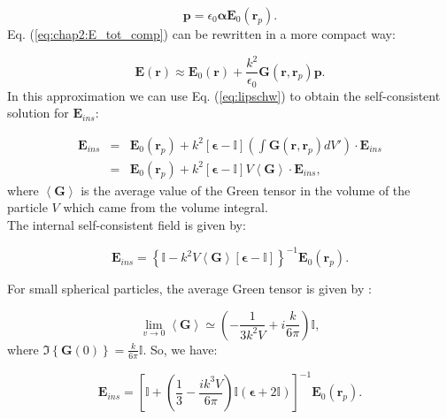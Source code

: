 \begin{equation}
\mathbf{p}=\epsilon_0\boldsymbol{\alpha}\mathbf{E}_{0}\left(\mathbf{r}_{p}\right).
\end{equation}
Eq. (\ref{eq:chap2:E_tot_comp}) can be rewritten in a more compact way:

\begin{equation}
\mathbf{E}\left(\mathbf{r}\right) \approx \mathbf{E}_{0}\left(\mathbf{r}\right) + \frac{k^2}{\epsilon_{0}}\mathbf{G}\left(\mathbf{r},\mathbf{r}_{p}\right)\mathbf{p}.
\end{equation}
In this approximation we can use Eq. (\ref{eq:lipschw}) to obtain the self-consistent solution for $\mathbf{E}_{ins}$:

\begin{eqnarray}
\mathbf{E}_{ins} & = & \mathbf{E}_{0}\left(\mathbf{r}_{p}\right)+k^{2}\left[\boldsymbol{\epsilon}-\mathbb{I}\right]\left(\int \mathbf{G}\left(\mathbf{r},\mathbf{r}_{p}\right)dV'\right)\cdot\mathbf{E}_{ins}\nonumber \\
 & = & \mathbf{E}_{0}\left(\mathbf{r}_{p}\right)+k^2\left[\boldsymbol{\epsilon}-\mathbb{I}\right]V\left<\mathbf{G}\right>\cdot\mathbf{E}_{ins},
\end{eqnarray}
where $\left<\mathbf{G}\right>$  is the average value of the Green tensor in the volume of the particle $V$ which came from the volume integral.\\
The internal self-consistent field is given by:

\begin{equation}
\mathbf{E}_{ins} = \left\{\mathbb{I}-k^2V\left<\mathbf{G}\right>\left[\boldsymbol{\epsilon}-\mathbb{I}\right]\right\}^{-1}\mathbf{E}_{0}\left(\mathbf{r}_{p}\right).
\end{equation}

For small spherical particles, the average Green tensor is given by \cite{Bladel_1961, Yaghjian_1980,Wang_1991,Carminati_2006}:

\begin{equation}
\lim_{v\rightarrow 0}\left<\mathbf{G}\right>\simeq \left(-\frac{1}{3k^2V}+i\frac{k}{6\pi}\right)\mathbb{I},
\end{equation}
where $\Im\left\{\mathbf{G}\left(0\right)\right\}=\frac{k}{6\pi}\mathbb{I}$.
So, we have:

\begin{equation}
\mathbf{E}_{ins} = \left[\mathbb{I}+\left(\frac{1}{3}-\frac{ik^3V}{6\pi}\right)\mathbb{I}\left(\boldsymbol{\epsilon}+2\mathbb{I}\right)\right]^{-1}\mathbf{E}_{0}\left(\mathbf{r}_{p}\right).
\end{equation}



